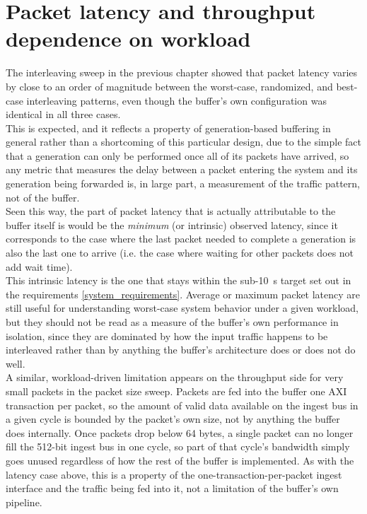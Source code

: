 \section{Packet latency and throughput dependence on workload}

The interleaving sweep in the previous chapter showed that packet latency
varies by close to an order of magnitude between the worst-case, randomized, and best-case
interleaving patterns, even though the buffer's own configuration was identical in all three cases. \\

This is expected, and it reflects a property of generation-based buffering in general rather 
than a shortcoming of this particular design, due to the simple fact that a generation can only be performed 
once all of its packets have arrived, so any metric that measures the delay between a packet 
entering the system and its generation being
forwarded is, in large part, a measurement of the traffic pattern, not of the buffer.\\

Seen this way, the part of packet latency that is actually attributable to the buffer itself is
would be the \emph{minimum} (or intrinsic) observed latency, since it corresponds to the case where
the last packet needed to complete a generation is also the last one to arrive (i.e. the case
where waiting for other packets does not add wait time). \\

This intrinsic latency is the one that
stays within the sub-10~\textmu s target set out in the requirements \ref{system_requirements}. Average or
maximum packet latency are still useful for
understanding worst-case system behavior under a given workload, but they should not be read as
a measure of the buffer's own performance in isolation, since they are dominated by how the
input traffic happens to be interleaved rather than by anything the buffer's architecture does
or does not do well. \\

A similar, workload-driven limitation appears on the throughput side for very small packets in
the packet size sweep. Packets are fed into the buffer one AXI transaction per packet, 
so the amount of valid data available on the ingest bus in a given cycle
is bounded by the packet's own size, not by anything the buffer does internally. Once packets
drop below 64 bytes, a single packet can no longer fill the 512-bit ingest bus in one cycle, so
part of that cycle's bandwidth simply goes unused regardless of how the rest of the buffer is
implemented. As with the latency case above, this is a property of the one-transaction-per-packet
ingest interface and the traffic being fed into it, not a limitation of the buffer's own
pipeline.


